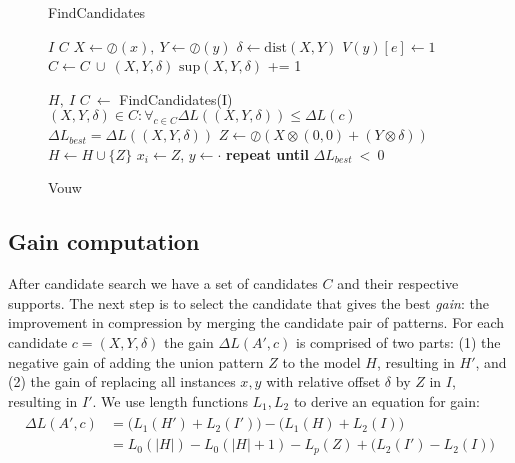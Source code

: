 \documentclass{llncs}
\begin{document}
\begin{figure*}[t]
\vspace{-\baselineskip}
\begin{minipage}[t]{.45\textwidth}
	\begin{algorithm}[H]
	\caption{FindCandidates}
	\begin{algorithmic}[1]
	\Require $I$
	\Ensure $C$
			\State $X \gets \oslash(x), \ Y \gets \oslash(y)$
			\State $\delta \gets \mathrm{dist}(X,Y)$
				\State $V(y)[e] \gets 1$
			\EndIf
			\State $C \gets C \ \cup \ (X,Y,\delta)$
			\State $\mathrm{sup}(X,Y,\delta)$ += 1
		\EndFor
	\EndFor
	\end{algorithmic}
	\end{algorithm}%
\end{minipage}%
\begin{minipage}[t]{.55\textwidth}
	\begin{algorithm}[H]
	\caption{Vouw}
	\label{alg:vouw}
	\begin{algorithmic}[1]
	\Require $H,\ I$
		\State $C \ \gets$ FindCandidates(I)
		\State $(X,Y,\delta) \in C : \forall_{c \in C} \Delta L((X,Y,\delta)) \leq \Delta L(c)$
	\State $\Delta L_{best} = \Delta L((X,Y,\delta))$
		\State $Z \gets \oslash(X\otimes(0,0) + (Y\otimes\delta))$
		\State $H \gets H \cup \{Z\}$
				\State $x_i \gets Z$,  $y \gets \cdot$
			\EndFor
		\EndFor
	\EndIf
	\State \textbf{repeat until} $\Delta L_{best} \ < \ 0$
	\end{algorithmic}%
	\vspace{-1.75pt}
	\end{algorithm}
\end{minipage}
\end{figure*}

\subsection{Gain computation}

After candidate search we have a set of candidates $C$ and their respective supports. The next step is to select the candidate that gives the best \emph{gain}: the improvement in compression by merging the candidate pair of patterns. For each candidate $c=(X,Y,\delta)$ the gain $\Delta L(A',c)$  is comprised of two parts: (1) the negative gain of adding the union pattern $Z$ to the model $H$, resulting in $H'$, and (2) the gain of replacing all instances $x,y$ with relative offset $\delta$ by $Z$ in $I$, resulting in $I'$. We use length functions $L_1, L_2$ to derive an equation for gain:
\begin{align}
\label{gain}
\begin{split}
	\Delta L(A',c) &= \Big(L_1(H') + L_2(I') \Big) - \Big(L_1(H) + L_2(I) \Big) \\
			    &= L_0(|H|) - L_0(|H|+1) - L_p(Z) + \Big(L_2(I') - L_2(I) \Big)
\end{split}
\end{align}
\end{document}
